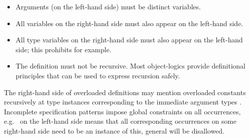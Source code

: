 \begin{isabellebody}
\begin{isamarkuptext}
  \begin{itemize}

  \item Arguments (on the left-hand side) must be distinct variables.

  \item All variables on the right-hand side must also appear on the
  left-hand side.

  \item All type variables on the right-hand side must also appear on
  the left-hand side; this prohibits  for example.

  \item The definition must not be recursive.  Most object-logics
  provide definitional principles that can be used to express
  recursion safely.

  \end{itemize}

  The right-hand side of overloaded definitions may mention overloaded constants
  recursively at type instances corresponding to the immediate
  argument types .  Incomplete
  specification patterns impose global constraints on all occurrences,
  e.g.\  on the left-hand side means that all
  corresponding occurrences on some right-hand side need to be an
  instance of this, general  will be disallowed.


\end{isamarkuptext}
\end{isabellebody}
